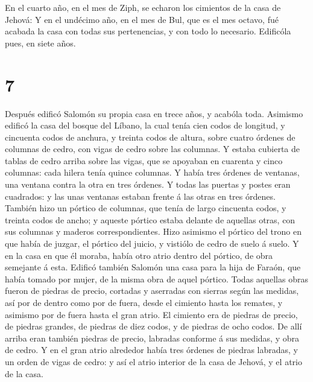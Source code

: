  En el cuarto año, en el mes de Ziph, se echaron los
cimientos de la casa de Jehová:  Y en el undécimo año, en
el mes de Bul, que es el mes octavo, fué acabada la casa con todas sus
pertenencias, y con todo lo necesario. Edificóla pues, en siete años.

\hypertarget{section-6}{%
\section{7}\label{section-6}}

 Después edificó Salomón su propia casa en trece años, y
acabóla toda.  Asimismo edificó la casa del bosque del
Líbano, la cual tenía cien codos de longitud, y cincuenta codos de
anchura, y treinta codos de altura, sobre cuatro órdenes de columnas de
cedro, con vigas de cedro sobre las columnas.  Y estaba
cubierta de tablas de cedro arriba sobre las vigas, que se apoyaban en
cuarenta y cinco columnas: cada hilera tenía quince columnas.
 Y había tres órdenes de ventanas, una ventana contra la
otra en tres órdenes.  Y todas las puertas y postes eran
cuadrados: y las unas ventanas estaban frente á las otras en tres
órdenes.  También hizo un pórtico de columnas, que tenía de
largo cincuenta codos, y treinta codos de ancho; y aqueste pórtico
estaba delante de aquellas otras, con sus columnas y maderos
correspondientes.  Hizo asimismo el pórtico del trono en que
había de juzgar, el pórtico del juicio, y vistiólo de cedro de suelo á
suelo.  Y en la casa en que él moraba, había otro atrio
dentro del pórtico, de obra semejante á esta. Edificó también Salomón
una casa para la hija de Faraón, que había tomado por mujer, de la misma
obra de aquel pórtico.  Todas aquellas obras fueron de
piedras de precio, cortadas y aserradas con sierras según las medidas,
así por de dentro como por de fuera, desde el cimiento hasta los
remates, y asimismo por de fuera hasta el gran atrio.  El
cimiento era de piedras de precio, de piedras grandes, de piedras de
diez codos, y de piedras de ocho codos.  De allí arriba
eran también piedras de precio, labradas conforme á sus medidas, y obra
de cedro.  Y en el gran atrio alrededor había tres órdenes
de piedras labradas, y un orden de vigas de cedro: y así el atrio
interior de la casa de Jehová, y el atrio de la casa.

